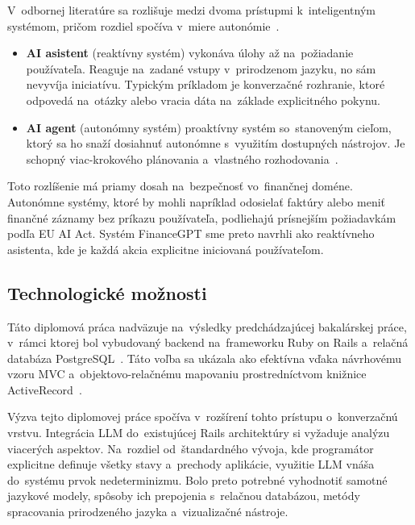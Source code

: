 V~odbornej literatúre sa rozlišuje medzi dvoma prístupmi k~inteligentným
systémom, pričom rozdiel spočíva v~miere autonómie~\cite{ibm2024}.

\begin{itemize}
	\item \textbf{AI asistent} (reaktívny systém) vykonáva úlohy až na~požiadanie
		používateľa. Reaguje na~zadané vstupy v~prirodzenom jazyku, no sám nevyvíja
		iniciatívu. Typickým príkladom je konverzačné rozhranie, ktoré odpovedá na~otázky
		alebo vracia dáta na~základe explicitného pokynu.

	\item \textbf{AI agent} (autonómny systém) proaktívny systém so~stanoveným
		cieľom, ktorý sa ho snaží dosiahnuť autonómne s~využitím dostupných nástrojov.
		Je schopný viac-krokového plánovania a~vlastného rozhodovania~\cite{zhao2023,
		yao2023react}.
\end{itemize}

Toto rozlíšenie má priamy dosah na~bezpečnosť vo~finančnej doméne. Autonómne systémy,
ktoré by mohli napríklad odosielať faktúry alebo meniť finančné záznamy bez
príkazu používateľa, podliehajú prísnejším požiadavkám podľa EU AI Act. Systém
FinanceGPT sme preto navrhli ako reaktívneho asistenta, kde je každá akcia explicitne
iniciovaná používateľom.

\subsection{Technologické možnosti}

Táto diplomová práca nadväzuje na~výsledky predchádzajúcej bakalárskej práce, v~rámci
ktorej bol vybudovaný backend na~frameworku Ruby on Rails a~relačná databáza PostgreSQL~\cite{gasparovic2023}.
Táto voľba sa ukázala ako efektívna vďaka návrhovému vzoru MVC a~objektovo-relačnému
mapovaniu prostredníctvom knižnice ActiveRecord~\cite{ruby2025}.

Výzva tejto diplomovej práce spočíva v~rozšírení tohto prístupu o~konverzačnú
vrstvu. Integrácia LLM do~existujúcej Rails architektúry si vyžaduje analýzu viacerých
aspektov. Na~rozdiel od~štandardného vývoja, kde programátor explicitne definuje všetky
stavy a~prechody aplikácie, využitie LLM vnáša do~systému prvok nedeterminizmu. Bolo
preto potrebné vyhodnotiť samotné jazykové modely, spôsoby ich prepojenia s~relačnou
databázou, metódy spracovania prirodzeného jazyka a~vizualizačné nástroje.

